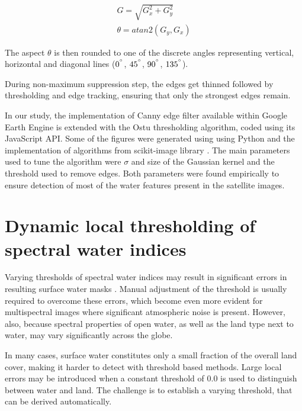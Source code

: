 \begin{gather}
G = \sqrt{G_x^2 + G_y^2} \\
\theta = atan2\left(G_y, G_x\right)
\end{gather}

The aspect $\theta$ is then rounded to one of the discrete angles representing vertical, horizontal and diagonal lines ($0^{\degree}$, $45^{\degree}$, $90^{\degree}$, $135^{\degree}$).

During non-maximum suppression step, the edges get thinned followed by thresholding and edge tracking, ensuring that only the strongest edges remain.

In our study, the implementation of Canny edge filter available within Google Earth Engine is extended with the Ostu thresholding algorithm, coded using its JavaScript API. Some of the figures were generated using using Python and the implementation of algorithms from scikit-image library \citep{webScikitImage}. The main parameters used to tune the algorithm were $\sigma$ and size of the Gaussian kernel and the threshold used to remove edges. Both parameters were found empirically to ensure detection of most of the water features present in the satellite images.

\section{Dynamic local thresholding of spectral water indices}


Varying thresholds of spectral water indices may result in significant errors in resulting surface water masks \citep{Yang2014}. Manual adjustment of the threshold is usually required to overcome these errors, which become even more evident for multispectral images where significant atmospheric noise is present. However, also, because spectral properties of open water, as well as the land type next to water, may vary significantly across the globe. 

In many cases, surface water constitutes only a small fraction of the overall land cover, making it harder to detect with threshold based methods. Large local errors may be introduced when a constant threshold of 0.0 is used to distinguish between water and land. The challenge is to establish a varying threshold, that can be derived automatically. 

